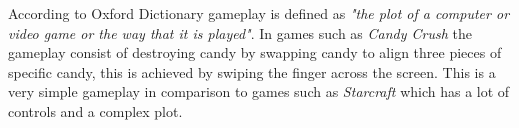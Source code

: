 According to Oxford Dictionary gameplay is defined as \textit{"the plot of a computer or video game or the way that it is played"}.
In games such as \textit{Candy Crush}  the gameplay consist of destroying candy by swapping candy to align three pieces of specific candy, this is achieved by swiping the finger across the screen.
This is a very simple gameplay in comparison to games such as \textit{Starcraft}  which has a lot of controls and a complex plot.
